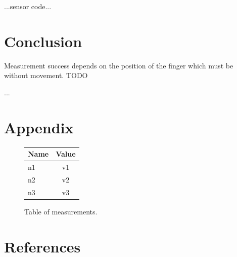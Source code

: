\documentclass[11pt,a4paper]{article}
\begin{document}
...sensor code\cite{SENSOR}...

\section{Conclusion}
Measurement success depends on the position of the finger which must be without movement. TODO

...

\newpage %

\section{Appendix}

\begin{figure}[H]
    \begin{center}
        \begin{tabular}{|l|c|}
            \hline
            \textbf{Name} & \textbf{Value} \\
            \hline\hline
            n1 & v1 \\\hline
            n2 & v2 \\\hline
            n3 & v3 \\\hline
        \end{tabular}
    \end{center}
    \caption{Table of measurements.}
    \label{fig:measurements}
\end{figure}

\newpage %

\section{References}

\begin{flushleft}
    
\end{flushleft}


\end{document}
